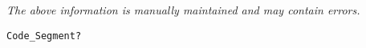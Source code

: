 \label{pkg:code\_segment}

{\tiny \it The above information is manually maintained and may contain errors.}
\begin{verbatim}
Code_Segment?
\end{verbatim}
